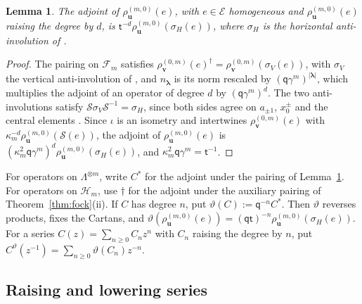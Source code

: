 \documentclass[11pt]{amsart}
\newtheorem{lemma}[theorem]{Lemma}
\theoremstyle{definition}
\theoremstyle{remark}
\newcommand{\Mq}{\mathsf q}                      %
\newcommand{\Mt}{\mathsf t}                      %
\newcommand{\bv}{{\mathbf v}}                    %
\newcommand{\La}{\Lambda}                        %
\newcommand{\bl}{{\boldsymbol{\lambda}}}         %
\newcommand{\srcnorm}[1]{n_{#1}}                 %
\newcommand{\Fock}[1]{\mathcal F_{#1}}            %
\newcommand{\HH}{\mathcal H}
\newcommand{\Hsp}[1]{\HH_{#1}}                   %
\newcommand{\sigH}{\sigma_H}                     %
\newcommand{\bu}{{\mathbf u}}                    %
\newcommand{\Hiso}{\iota}                        %
\newcommand{\kappam}[1]{\kappa_{#1}}             %
\newcommand{\rhov}{\rho^{(0,m)}_{\bv}}           %
\newcommand{\rhou}{\rho^{(m,0)}_{\bu}}           %
\newcommand{\Miki}{\mathcal S}                   %
\newcommand{\sigV}{\sigma_V}                     %
\begin{document}
\begin{lemma}\label{lem:sourceadjoint}
The adjoint of \(\rhou(e)\), with \(e\in\mathcal E\) homogeneous and \(\rhou(e)\) raising the
degree by \(d\), is \(\Mt^{-d}\rhou(\sigH(e))\), where \(\sigH\) is the horizontal
anti-involution of \cite[(2.21)]{BCS}.
\end{lemma}

\begin{proof}
The pairing \cite[(2.25)]{BCS} on \(\Fock{m}\) satisfies \(\rhov(e)^\dagger=\rhov(\sigV(e))\), with
\(\sigV\) the vertical anti-involution of \cite[(2.21)]{BCS}, and \(\srcnorm{\bl}\) is
its norm rescaled by \((\Mq\gamma^m)^{|\bl|}\), which multiplies the adjoint of an
operator of degree \(d\) by \((\Mq\gamma^m)^d\). The two anti-involutions satisfy
\(\Miki\sigV\Miki^{-1}=\sigH\), since both sides agree on \(a_{\pm1}\), \(x^\pm_0\) and the
central elements \cite[(2.9) and (2.21)]{BCS}. Since \(\Hiso\) is an isometry and
intertwines \(\rhov(e)\) with \(\kappam{m}^{-d}\rhou(\Miki(e))\), the adjoint of
\(\rhou(e)\) is \((\kappam{m}^2\Mq\gamma^m)^d\rhou(\sigH(e))\), and
\(\kappam{m}^2\Mq\gamma^m=\Mt^{-1}\).
\end{proof}

For operators on \(\La^{\otimes m}\), write \(C^*\) for the adjoint under the
pairing of Lemma~\ref{lem:sourceadjoint}. For operators on \(\Hsp{m}\), use
\(\dagger\) for the adjoint under the auxiliary pairing of Theorem~\ref{thm:fock}(ii).
If \(C\) has degree \(n\), put \(\vartheta(C):=\Mq^{-n}C^*\).
Then \(\vartheta\) reverses products, fixes the Cartans,
and \(\vartheta(\rhou(e))=(\Mq\Mt)^{-n}\rhou(\sigH(e))\). For a series
\(C(z)=\sum_{n\geq0}C_nz^n\) with \(C_n\) raising the degree by \(n\), put
\(C^\vartheta(z^{-1})=\sum_{n\geq0}\vartheta(C_n)z^{-n}\).

\subsection{Raising and lowering series}\label{sec:raising}
\end{document}
